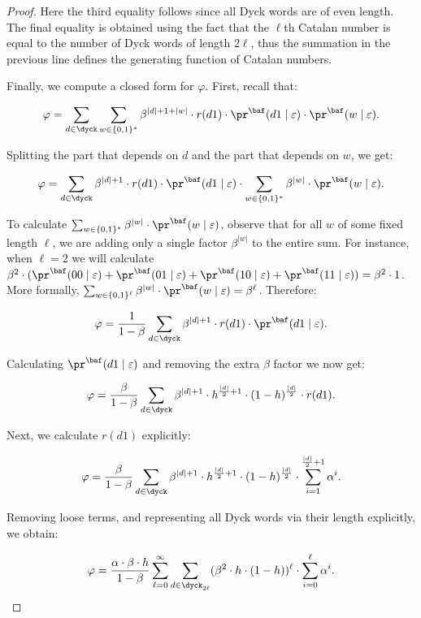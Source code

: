 \begin{proof}
Here the third equality follows since all Dyck words are of even length. The final equality is obtained using the fact that the $\ell$th Catalan number is equal to the number of Dyck words of length $2\ell$, thus the summation in the previous line defines the generating function of Catalan numbers.

Finally, we compute a closed form for $\varphi$. First, recall that:

$$\varphi = \sum_{d\in \dyck}  \sum_{w\in \{0,1\}^*}\beta^{|d|+1+|w|}\cdot r(d1) \cdot \pr^{\baf}(d1\mid \varepsilon)\cdot \pr^{\baf}(w\mid \varepsilon).$$

Splitting the part that depends on $d$ and the part that depends on $w$, we get:

$$\varphi = \sum_{d\in \dyck}  \beta^{|d|+1}\cdot r(d1) \cdot \pr^{\baf}(d1\mid \varepsilon)\cdot \sum_{w\in \{0,1\}^*} \beta^{|w|}\cdot \pr^{\baf}(w\mid \varepsilon).$$

To calculate $\sum_{w\in \{0,1\}^*} \beta^{|w|}\cdot \pr^{\baf}(w\mid \varepsilon)$, observe that for all $w$ of some fixed length $\ell$, we are adding only a single factor $\beta^{|w|}$ to the entire sum. For instance, when $\ell=2$ we will calculate $\beta^2\cdot (\pr^{\baf}(00\mid \varepsilon)+\pr^{\baf}(01\mid \varepsilon)+\pr^{\baf}(10\mid \varepsilon)+\pr^{\baf}(11\mid \varepsilon)) = \beta^2\cdot 1$. More formally, $\sum_{w\in \{0,1\}^{\ell}} \beta^{|w|}\cdot \pr^{\baf}(w\mid \varepsilon) = \beta^{\ell}$. Therefore:

$$\varphi = \frac{1}{1-\beta}\sum_{d\in \dyck}  \beta^{|d|+1}\cdot r(d1) \cdot \pr^{\baf}(d1\mid \varepsilon).$$

Calculating $\pr^{\baf}(d1\mid \varepsilon)$ and removing the extra $\beta$ factor we now get:

$$\varphi = \frac{\beta}{1-\beta}\sum_{d\in \dyck}  \beta^{|d|+1} \cdot h^{\frac{|d|}{2}+1}\cdot (1-h)^{\frac{|d|}{2}}\cdot r(d1).$$

Next, we calculate $r(d1)$ explicitly:

$$\varphi = \frac{\beta}{1-\beta}\sum_{d\in \dyck}  \beta^{|d|+1} \cdot h^{\frac{|d|}{2}+1}\cdot (1-h)^{\frac{|d|}{2}}\cdot \sum_{i=1}^{\frac{|d|}{2}+1}\alpha^i.$$

Removing loose terms, and representing all Dyck words via their length explicitly, we obtain:

$$\varphi = \frac{\alpha\cdot \beta\cdot h}{1-\beta}\sum_{\ell=0}^{\infty}\sum_{d\in \dyck_{2\ell}}  (\beta^{2}\cdot h\cdot (1-h))^{\ell}\cdot \sum_{i=0}^{\ell}\alpha^i.$$


\end{proof}
